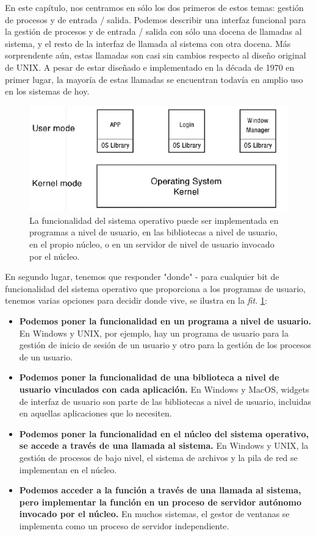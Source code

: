 \documentclass[10pt]{book}
\begin{document}
En este capítulo, nos centramos en sólo los dos primeros de estos temas: gestión de procesos y de entrada / salida. Podemos describir una interfaz funcional para la gestión de procesos y de entrada / salida con sólo una docena de llamadas al sistema, y el resto de la interfaz de llamada al sistema con otra docena. Más sorprendente aún, estas llamadas son casi sin cambios respecto al diseño original de UNIX. A pesar de estar diseñado e implementado en la década de 1970 en primer lugar, la mayoría de estas llamadas se encuentran todavía en amplio uso en los sistemas de hoy.

\begin{figure}[tbhp]
\centerline{\includegraphics[scale=0.45]{img/fig0301}}
\caption{La funcionalidad del sistema operativo puede ser implementada en programas a nivel de usuario, en las bibliotecas a nivel de usuario, en el propio núcleo, o en un servidor de nivel de usuario invocado por el núcleo.}
\label{fig0301}
\end{figure}

En segundo lugar, tenemos que responder "donde" - para cualquier bit de funcionalidad del sistema operativo que proporciona a los programas de usuario, tenemos varias opciones para decidir donde vive, se ilustra en la \textit{fit.} \ref{fig0301}:

\begin{itemize}
\item \textbf{Podemos poner la funcionalidad en un programa a nivel de usuario.} En Windows y UNIX, por ejemplo, hay un programa de usuario para la gestión de inicio de sesión de un usuario y otro para la gestión de los procesos de un usuario.

\item \textbf{Podemos poner la funcionalidad de una biblioteca a nivel de usuario vinculados con cada aplicación.} En Windows y MacOS, widgets de interfaz de usuario son parte de las bibliotecas a nivel de usuario, incluidas en aquellas aplicaciones que lo necesiten.

\item \textbf{Podemos poner la funcionalidad en el núcleo del sistema operativo, se accede a través de una llamada al sistema.} En Windows y UNIX, la gestión de procesos de bajo nivel, el sistema de archivos y la pila de red se implementan en el núcleo.

\item \textbf{Podemos acceder a la función a través de una llamada al sistema, pero implementar la función en un proceso de servidor autónomo invocado por el núcleo.} En muchos sistemas, el gestor de ventanas se implementa como un proceso de servidor independiente.
\end{itemize}
\end{document}
